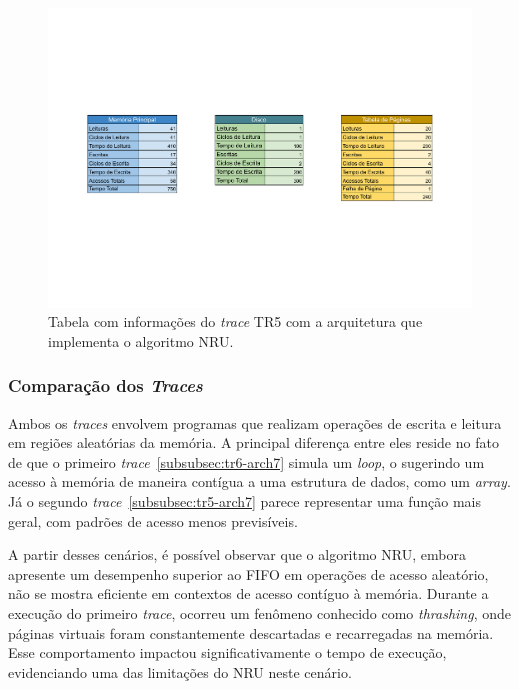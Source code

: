 \documentclass[
	12pt,				%
	oneside,   	        %
	a4paper,			%
	english,			%
	french,				%
	spanish,			%
	brazil,				%
	]{pacotes/abntex2}
\begin{document}
\begin{figure}[H]
  \centering
  \includegraphics[scale=0.5]{figuras/Architecture07-TLB(none) TR5.pdf}
  \caption{Tabela com informações do \textit{trace} TR5 com a arquitetura que implementa o algoritmo NRU.}
  \label{fig:tr5-arch07}
\end{figure}

\subsubsection{Comparação dos \textit{Traces}}
\label{subsubsec:comp-traces-arch7}

Ambos os \textit{traces} envolvem programas que realizam operações de escrita e leitura em regiões aleatórias da memória. A principal diferença entre eles reside no fato de que o primeiro \textit{trace}~\ref{subsubsec:tr6-arch7} simula um \textit{loop}, o sugerindo um acesso à memória de maneira contígua a uma estrutura de dados, como um \textit{array}. Já o segundo \textit{trace}~\ref{subsubsec:tr5-arch7} parece representar uma função mais geral, com padrões de acesso menos previsíveis.

A partir desses cenários, é possível observar que o algoritmo NRU, embora apresente um desempenho superior ao FIFO em operações de acesso aleatório, não se mostra eficiente em contextos de acesso contíguo à memória. Durante a execução do primeiro \textit{trace}, ocorreu um fenômeno conhecido como \textit{thrashing}, onde páginas virtuais foram constantemente descartadas e recarregadas na memória. Esse comportamento impactou significativamente o tempo de execução, evidenciando uma das limitações do NRU neste cenário.
\end{document}
